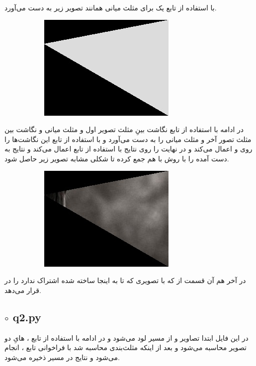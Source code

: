 \documentclass[a4paper,12pt]{article}
\begin{document}
 با استفاده از تابع 
یک 
برای مثلث میانی همانند تصویر زیر به دست می‌آورد.	
\begin{figure}[H]
	\centering
	\begin{subfigure}{0.6\textwidth}
		\centering
		\includegraphics[width=.5\textwidth]{cropped_middle_frame_triangle_mask.jpg}
	\end{subfigure}
\end{figure}
در ادامه با استفاده از تابع 
نگاشت بینِ مثلث تصویر اول و مثلث میانی و نگاشت بین مثلث تصور آخر و مثلث میانی را به دست می‌آورد و با استفاده از تابع 
این نگاشت‌ها را روی 
و
اعمال می‌کند و در نهایت 
را روی نتایج با استفاده از تابع 
اعمال می‌کند و نتایج به دست آمده را با روش 
با هم جمع کرده تا شکلی مشابه تصویر زیر حاصل شود. 
\begin{figure}[H]
	\centering
	\begin{subfigure}{0.6\textwidth}
		\centering
		\includegraphics[width=.5\textwidth]{middle_triangle.jpg}
	\end{subfigure}
\end{figure}
در آخر هم آن قسمت از 
که با تصویری که تا به اینجا ساخته شده اشتراک ندارد را در 
قرار می‌دهد.

\subsection*{$\circ$ q2.py}

در این فایل ابتدا تصاویر
و
از مسیر 
لود می‌شود و در ادامه با استفاده از تابع 
 ، 
 ‌هایِ
 دو تصویر محاسبه می‌شود و بعد از اینکه مثلث‌بندی محاسبه شد با فراخوانی تابع 
 ،
 انجام می‌شود و نتایج در مسیر
 ذخیره می‌شود.
\end{document}
